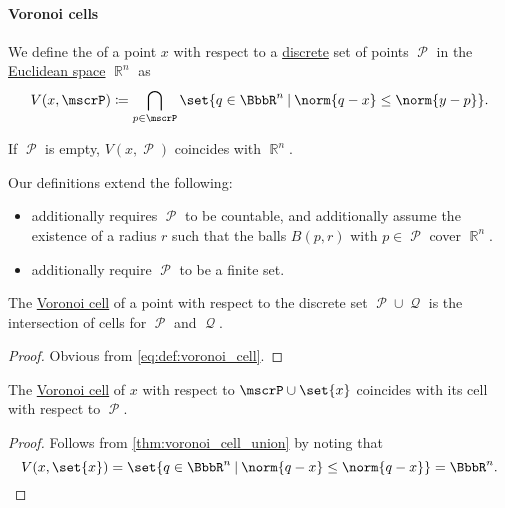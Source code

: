 \paragraph{Voronoi cells}

\begin{definition}\label{def:voronoi_cell}
  We define the  of a point \( x \) with respect to a \hyperref[def:discrete_set]{discrete} set of points \( \mscrP \) in the \hyperref[def:euclidean_space]{Euclidean space} \( \BbbR^n \) as
  \begin{equation}\label{eq:def:voronoi_cell}
    V(x, \mscrP) \coloneqq \bigcap_{p \in \mscrP} \set{ q \in \BbbR^n \given \norm{ q - x } \leq \norm{ y - p } }.
  \end{equation}

  If \( \mscrP \) is empty, \( V(x, \mscrP) \) coincides with \( \BbbR^n \).
\end{definition}
\begin{comments}
  \item Our definitions extend the following:
  \begin{itemize}
    \item {} additionally requires \( \mscrP \) to be countable, and additionally assume the existence of a radius \( r \) such that the balls \( B(p, r) \) with \( p \in \mscrP \) cover \( \BbbR^n \).

    \item {} additionally require \( \mscrP \) to be a finite set.
  \end{itemize}
\end{comments}

\begin{proposition}\label{thm:voronoi_cell_union}
  The \hyperref[def:voronoi_cell]{Voronoi cell} of a point with respect to the discrete set \( \mscrP \cup \mscrQ \) is the intersection of cells for \( \mscrP \) and \( \mscrQ \).
\end{proposition}
\begin{proof}
  Obvious from \eqref{eq:def:voronoi_cell}.
\end{proof}

\begin{corollary}\label{thm:voronoi_cell_self}
  The \hyperref[def:voronoi_cell]{Voronoi cell} of \( x \) with respect to \( \mscrP \cup \set{ x } \) coincides with its cell with respect to \( \mscrP \).
\end{corollary}
\begin{proof}
  Follows from \cref{thm:voronoi_cell_union} by noting that
  \begin{equation*}
    V(x, \set{ x }) = \set{ q \in \BbbR^n \given \norm{ q - x } \leq \norm{ q - x } } = \BbbR^n.
  \end{equation*}
\end{proof}

